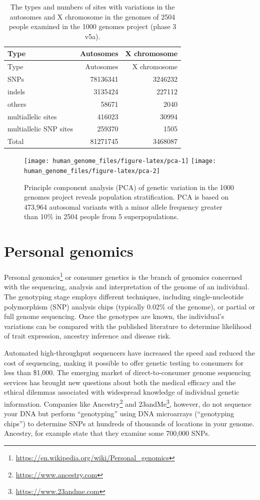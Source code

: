 \documentclass[]{book}
\let\rmarkdownfootnote\footnote%
\def\footnote{\protect\rmarkdownfootnote}
\renewcommand{\href}[2]{#2\footnote{\url{#1}}}
\begin{document}
\begin{longtable}[]{@{}lrr@{}}
\caption{\label{tab:stats} The types and numbers of sites with variations in
the autosomes and X chromosome in the genomes of 2504 people examined in
the 1000 genomes project (phase 3 v5a).}\tabularnewline
\toprule
Type & Autosomes & X chromosome\tabularnewline
\midrule
\endfirsthead
\toprule
Type & Autosomes & X chromosome\tabularnewline
\midrule
\endhead
SNPs & 78136341 & 3246232\tabularnewline
indels & 3135424 & 227112\tabularnewline
others & 58671 & 2040\tabularnewline
multiallelic sites & 416023 & 30994\tabularnewline
multiallelic SNP sites & 259370 & 1505\tabularnewline
Total & 81271745 & 3468087\tabularnewline
\bottomrule
\end{longtable}






\begin{figure}

{\centering \texttt{[image: human\_genome\_files/figure-latex/pca-1]} \texttt{[image: human\_genome\_files/figure-latex/pca-2]} 

}

\caption{Principle component analysis (PCA) of genetic variation in
the 1000 genomes project reveals population stratification. PCA is based
on 473,964 autosomal variants with a minor allele frequency greater than
10\% in 2504 people from 5 superpopulations.}\label{fig:pca}
\end{figure}

\section{Personal genomics}\label{personal-genomics}

\href{https://en.wikipedia.org/wiki/Personal_genomics}{Personal
genomics} or consumer genetics is the branch of genomics concerned with
the sequencing, analysis and interpretation of the genome of an
individual. The genotyping stage employs different techniques, including
single-nucleotide polymorphism (SNP) analysis chips (typically 0.02\% of
the genome), or partial or full genome sequencing. Once the genotypes
are known, the individual's variations can be compared with the
published literature to determine likelihood of trait expression,
ancestry inference and disease risk.

Automated high-throughput sequencers have increased the speed and
reduced the cost of sequencing, making it possible to offer genetic
testing to consumers for less than \$1,000. The emerging market of
direct-to-consumer genome sequencing services has brought new questions
about both the medical efficacy and the ethical dilemmas associated with
widespread knowledge of individual genetic information. Companies like
\href{https://www.ancestry.com}{Ancestry} and
\href{https://www.23andme.com}{23andMe}, however, do not sequence your
DNA but perform ``genotyping'' using DNA microarrays (``genotyping
chips'') to determine SNPs at hundreds of thousands of locations in your
genome. Ancestry, for example state that they examine some 700,000 SNPs.
\end{document}
